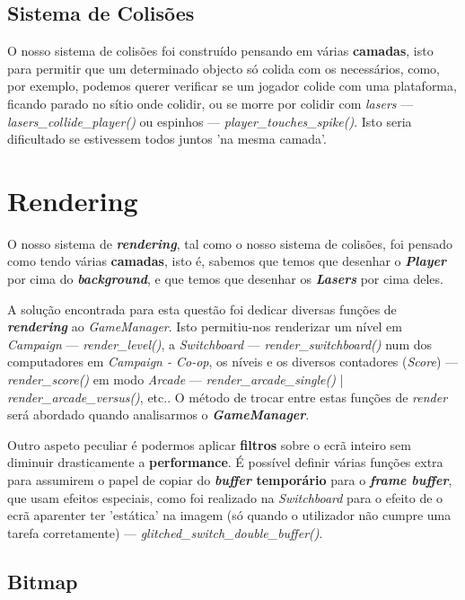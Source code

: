 \documentclass{report}
\begin{document}
\subsection{Sistema de Colisões}

O nosso sistema de colisões foi construído pensando em várias \textbf{camadas}, isto para permitir que um determinado objecto só colida com os necessários, como, por exemplo, podemos querer verificar se um jogador colide com uma plataforma, ficando parado no sítio onde colidir, ou se morre por colidir com \textit{lasers} --- \textit{lasers\_collide\_player()} ou espinhos --- \textit{player\_touches\_spike()}. Isto seria dificultado se estivessem todos juntos 'na mesma camada'.

\section{Rendering}

O nosso sistema de \textbf{\textit{rendering}}, tal como o nosso sistema de colisões, foi pensado como tendo várias \textbf{camadas}, isto é, sabemos que temos que desenhar o \textbf{\textit{Player}} por cima do \textbf{\textit{background}}, e que temos que desenhar os \textbf{\textit{Lasers}} por cima deles.

A solução encontrada para esta questão foi dedicar diversas funções de \textbf{\textit{rendering}} ao \textit{GameManager}. Isto permitiu-nos renderizar um nível em \textit{Campaign} --- \textit{render\_level()}, a \textit{Switchboard} --- \textit{render\_switchboard()} num dos computadores em \textit{Campaign - Co-op}, os níveis e os diversos contadores (\textit{Score}) --- \textit{render\_score()} em modo \textit{Arcade} --- \textit{render\_arcade\_single()} | \textit{render\_arcade\_versus()}, etc.. O método de trocar entre estas funções de \textit{render} será abordado quando analisarmos o \textbf{\textit{GameManager}}.

Outro aspeto peculiar é podermos aplicar \textbf{filtros} sobre o ecrã inteiro sem diminuir drasticamente a \textbf{performance}. É possível definir várias funções extra para assumirem o papel de copiar do \textbf{\textit{buffer} temporário} para o \textbf{\textit{frame buffer}}, que usam efeitos especiais, como foi realizado na \textit{Switchboard} para o efeito de o ecrã aparenter ter 'estática' na imagem (só quando o utilizador não cumpre uma tarefa corretamente) --- \textit{glitched\_switch\_double\_buffer()}. 

\subsection{Bitmap}
\end{document}

